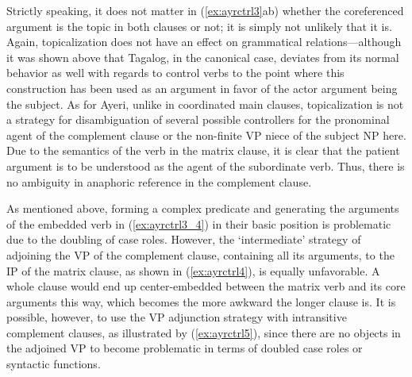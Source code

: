 \begin{figure}

\xe%
\end{figure}

Strictly speaking, it does not matter in (\ref{ex:ayrctrl3}ab) whether the
coreferenced argument is the topic in both clauses or not; it is simply not
unlikely that it is. Again, topicalization does not have an effect on
grammatical relations---although it was shown above that Tagalog, in the
canonical case, deviates from its normal behavior as well with regards to
control verbs to the point where this construction has been used as an argument
in favor of the actor argument being the subject. As for Ayeri, unlike in
coordinated main clauses, topicalization is not a strategy for disambiguation
of several possible controllers for the pronominal agent of the complement
clause or the non-finite VP niece of the subject NP here. Due to the
semantics of the verb in the matrix clause, it is clear that the patient
argument is to be understood as the agent of the subordinate verb. Thus, there
is no ambiguity in anaphoric reference in the complement clause.

As mentioned above, forming a complex predicate and generating the arguments of
the embedded verb in (\ref{ex:ayrctrl3_4}) in their basic position is
problematic due to the doubling of case roles. However, the `intermediate'
strategy of adjoining the VP of the complement clause, containing all its
arguments, to the IP of the matrix clause, as shown in (\ref{ex:ayrctrl4}), is
equally unfavorable. A whole clause would end up center-embedded between the
matrix verb and its core arguments this way, which becomes the more awkward the
longer clause is. It is possible, however, to use the VP adjunction strategy
with intransitive complement clauses, as illustrated by (\ref{ex:ayrctrl5}),
since there are no objects in the adjoined VP to become problematic in terms of
doubled case roles or syntactic functions.

